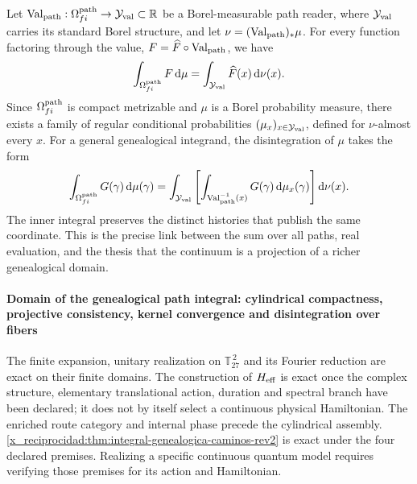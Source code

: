 Let
\(\operatorname{Val}_{\rm path}:\Omega^{\rm path}_{fi}\to\mathcal Y_{\rm val}\subset\mathbb R\)
be a Borel-measurable path reader, where \(\mathcal Y_{\rm val}\) carries its standard
Borel structure, and let
\(\nu=(\operatorname{Val}_{\rm path})_*\mu\). For every function
factoring through the value, \(F=\widehat F\circ\operatorname{Val}_{\rm path}\),
we have
\[
 \int_{\Omega^{\rm path}_{fi}}F\,\mathrm d\mu
 =\int_{\mathcal Y_{\rm val}}\widehat F(x)\,\mathrm d\nu(x).
\]
Since \(\Omega^{\rm path}_{fi}\) is compact metrizable and \(\mu\) is a Borel
probability measure, there exists a family of regular conditional
probabilities \((\mu_x)_{x\in\mathcal Y_{\rm val}}\), defined for \(\nu\)-almost every
\(x\). For a general genealogical integrand, the disintegration of
\(\mu\) takes the form
\begin{equation}
 \int_{\Omega^{\rm path}_{fi}}G(\gamma)\,\mathrm d\mu(\gamma)
 =\int_{\mathcal Y_{\rm val}}\left[
   \int_{\operatorname{Val}_{\rm path}^{-1}(x)}
   G(\gamma)\,\mathrm d\mu_x(\gamma)
  \right]\mathrm d\nu(x).
 \label{x_reciprocidad:eq:desintegracion-genealogica-caminos-rev2}
\end{equation}
The inner integral preserves the distinct histories that publish the same
coordinate. This is the precise link between the sum over all paths,
real evaluation, and the thesis that the continuum is a projection of
a richer genealogical domain.

\paragraph{Domain of the genealogical path integral: cylindrical compactness, projective consistency, kernel convergence and disintegration over fibers}
The finite expansion, unitary realization on
\(\mathbb T_{27}^{\,2}\) and its Fourier reduction are exact on their finite
domains. The construction of \(H_{\rm eff}\) is
exact once the complex structure, elementary translational
action, duration and spectral branch have been declared; it does not by itself select a
continuous physical Hamiltonian. The enriched route category and internal
phase precede the cylindrical assembly.
\cref{x_reciprocidad:thm:integral-genealogica-caminos-rev2} is exact under the four
declared premises. Realizing a specific continuous quantum model
requires verifying those premises for its action and Hamiltonian.
